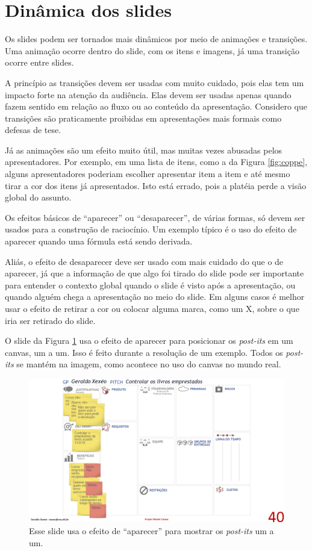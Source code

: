 \section{Dinâmica dos slides}
\label{sec:din}

Os slides podem ser tornados mais dinâmicos por meio de animações e transições. Uma animação ocorre dentro do slide, com os itens e imagens, já uma transição ocorre entre slides.

A princípio as transições devem ser usadas com muito cuidado, pois elas tem um impacto forte na atenção da audiência. Elas devem ser usadas apenas quando fazem sentido em relação ao fluxo ou ao conteúdo da apresentação. Considero que transições são praticamente proibidas em apresentações mais formais como defesas de tese.

Já as animações são um efeito muito útil, mas muitas vezes abusadas pelos apresentadores. Por exemplo, em uma lista de itens, como a da Figura \ref{fig:coppe}, alguns apresentadores poderiam escolher apresentar item a item e até mesmo tirar a cor dos itens já apresentados. Isto está errado, pois a platéia perde a visão global do assunto.

Os efeitos  básicos de ``aparecer'' ou ``desaparecer'', de várias formas, só devem ser usados para a construção de raciocínio. Um exemplo típico é o uso do efeito de aparecer quando uma fórmula está sendo derivada.

Aliás, o efeito de desaparecer deve ser usado com mais cuidado do que o de aparecer, já que a informação de que algo foi tirado do slide pode ser importante para entender o contexto global quando o slide é visto após a apresentação, ou quando alguém chega a apresentação no meio do slide. Em alguns casos é melhor usar o efeito de retirar a cor ou colocar alguma marca, como um X, sobre o que iria ser retirado do slide.

O slide da Figura \ref{fig:canvas} usa o efeito de aparecer para posicionar os \textit{post-its} em um canvas, um a um. Isso é feito durante a resolução de um exemplo. Todos os \textit{post-its} se mantém na imagem, como acontece no uso do canvas no mundo real.

\begin{figure}
    \centering
    \includegraphics[width=0.7\linewidth]{imagens/canvas}
    \caption{Esse slide usa o efeito de ``aparecer'' para mostrar os \textit{post-its} um a um.}
    \label{fig:canvas}
\end{figure}


